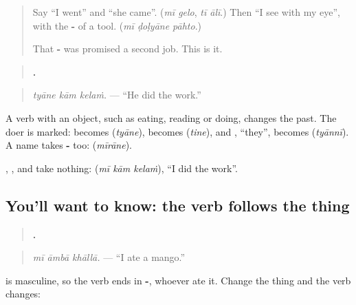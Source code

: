\label{lesson:MR-C276-tyane-kela}



\begin{quote}
Say \textquotedblleft{}I went\textquotedblright{} and \textquotedblleft{}she came\textquotedblright{}. (\emph{mī gelo}, \emph{tī ālī}.) Then \textquotedblleft{}I see with my eye\textquotedblright{}, with the \textbf{-} of a tool. (\emph{mī ḍoḷyāne pāhto}.)

That \textbf{-} was promised a second job. This is it.
\end{quote}

\begin{grammarlens}[title={Grammar Lens: the doer takes -\mr{ने}}]
\begin{quote}
\textbf{  .}
\end{quote}

\begin{quote}
\emph{tyāne kām kelaṁ.} — \textquotedblleft{}He did the work.\textquotedblright{}
\end{quote}

A verb with an object, such as eating, reading or doing, changes the past. The doer is marked: \textbf{} becomes \textbf{} (\emph{tyāne}), \textbf{} becomes \textbf{} (\emph{tine}), and \textbf{}, \textquotedblleft{}they\textquotedblright{}, becomes \textbf{} (\emph{tyānnī}). A name takes \textbf{-} too: \textbf{} (\emph{mīrāne}).

\textbf{}, \textbf{}, \textbf{} and \textbf{} take nothing: \textbf{  } (\emph{mī kām kelaṁ}), \textquotedblleft{}I did the work\textquotedblright{}.
\end{grammarlens}

\subsection*{You'll want to know: the verb follows the thing}
\begin{quote}
\textbf{  .}
\end{quote}

\begin{quote}
\emph{mī āmbā khāllā.} — \textquotedblleft{}I ate a mango.\textquotedblright{}
\end{quote}

\textbf{} is masculine, so the verb ends in \textbf{-}, whoever ate it. Change the thing and the verb changes:

